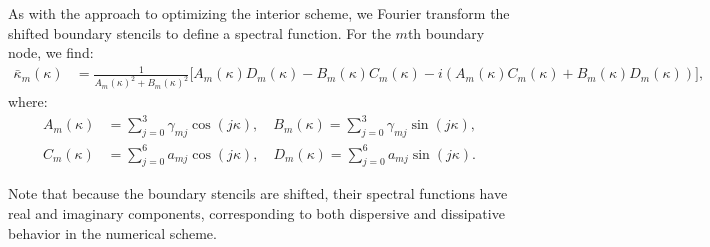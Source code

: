 As with the approach to optimizing the interior scheme, we Fourier transform the shifted boundary stencils to define a spectral function. For the $m$th boundary node, we find:  %
\begin{align}
\bar{\kappa}_m(\kappa) &= \frac{1}{A_m(\kappa)^2 + B_m(\kappa)^2} \big[ A_m(\kappa) D_m(\kappa) - B_m(\kappa) C_m(\kappa) - i (A_m(\kappa) C_m(\kappa) + B_m(\kappa) D_m(\kappa)) \big],
\end{align}
where:
\begin{align}
    A_m(\kappa) &= \sum_{j=0}^{3}{\gamma_{mj} \cos{(j \kappa)}}, \quad B_m(\kappa) = \sum_{j=0}^{3}{\gamma_{mj} \sin{(j \kappa)}},\\
    C_m(\kappa) &= \sum_{j=0}^{6}{a_{mj} \cos{(j \kappa)}}, \quad D_m(\kappa) = \sum_{j=0}^{6}{a_{mj} \sin{(j \kappa)}}.
\end{align}

Note that because the boundary stencils are shifted, their spectral functions have real and imaginary components, corresponding to both dispersive and dissipative behavior in the numerical scheme.

